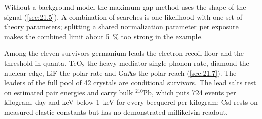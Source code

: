 Without a background model the maximum-gap method uses the shape of the signal (\cref{sec:21.5}). A combination of searches is one likelihood with one set of theory parameters; splitting a shared normalization parameter per exposure makes the combined limit about \SI{5}{\percent} too strong in the example.

Among the eleven survivors germanium leads the electron-recoil floor and the threshold in quanta, TeO$_2$ the heavy-mediator single-phonon rate, diamond the nuclear edge, LiF the polar rate and GaAs the polar reach (\cref{sec:21.7}). The leaders of the full pool of 42 crystals are conditional survivors. The lead salts rest on estimated pair energies and carry bulk $^{210}$Pb, which puts 724 events per kilogram, day and keV below \SI{1}{keV} for every becquerel per kilogram; CsI rests on measured elastic constants but has no demonstrated millikelvin readout.
